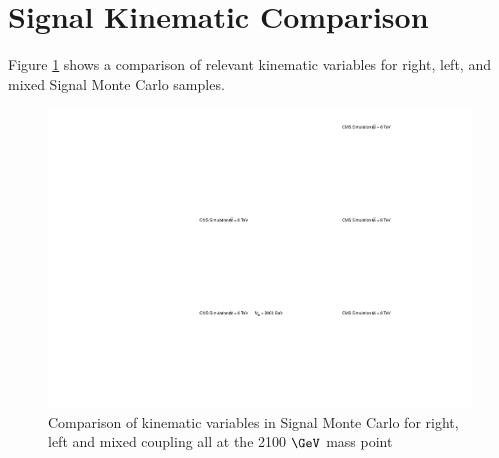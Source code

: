 \section{Signal Kinematic Comparison}
\label{sec:SigKinGen}
Figure \ref{figs:genkin} shows a comparison of relevant kinematic variables for right, left, and mixed Signal Monte Carlo samples.


\begin{figure}[Htcb]
\centering
\includegraphics[width=1.0\textwidth]{figs/CutCompqcdandsignalGencoupling.pdf}
\caption{Comparison of kinematic variables in Signal Monte Carlo for right, left and mixed coupling all at the 2100$~\GeV$ mass point }
\label{figs:genkin}
\end{figure}





